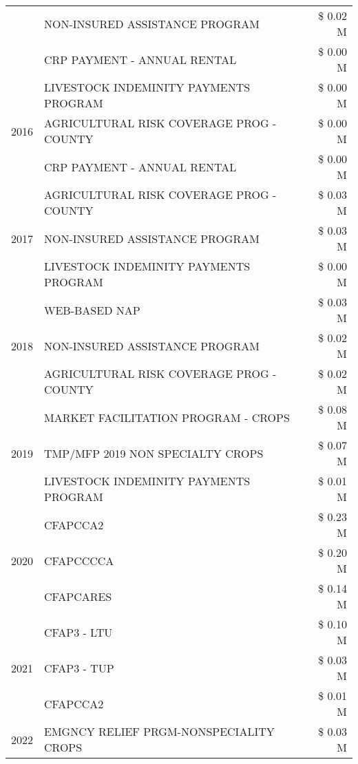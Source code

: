 \begin{tabular}{llr}
 & NON-INSURED ASSISTANCE PROGRAM & \$ 0.02 M \\
 & CRP PAYMENT - ANNUAL RENTAL & \$ 0.00 M \\
\cline{1-3}
\multirow[t]{3}{*}{2016} & LIVESTOCK INDEMINITY PAYMENTS PROGRAM & \$ 0.00 M \\
 & AGRICULTURAL RISK COVERAGE PROG - COUNTY & \$ 0.00 M \\
 & CRP PAYMENT - ANNUAL RENTAL & \$ 0.00 M \\
\cline{1-3}
\multirow[t]{3}{*}{2017} & AGRICULTURAL RISK COVERAGE PROG - COUNTY & \$ 0.03 M \\
 & NON-INSURED ASSISTANCE PROGRAM & \$ 0.03 M \\
 & LIVESTOCK INDEMINITY PAYMENTS PROGRAM & \$ 0.00 M \\
\cline{1-3}
\multirow[t]{3}{*}{2018} & WEB-BASED NAP & \$ 0.03 M \\
 & NON-INSURED ASSISTANCE PROGRAM & \$ 0.02 M \\
 & AGRICULTURAL RISK COVERAGE PROG - COUNTY & \$ 0.02 M \\
\cline{1-3}
\multirow[t]{3}{*}{2019} & MARKET FACILITATION PROGRAM - CROPS & \$ 0.08 M \\
 & TMP/MFP 2019 NON SPECIALTY CROPS & \$ 0.07 M \\
 & LIVESTOCK INDEMINITY PAYMENTS PROGRAM & \$ 0.01 M \\
\cline{1-3}
\multirow[t]{3}{*}{2020} & CFAPCCA2 & \$ 0.23 M \\
 & CFAPCCCCA & \$ 0.20 M \\
 & CFAPCARES & \$ 0.14 M \\
\cline{1-3}
\multirow[t]{3}{*}{2021} & CFAP3 - LTU & \$ 0.10 M \\
 & CFAP3 - TUP & \$ 0.03 M \\
 & CFAPCCA2 & \$ 0.01 M \\
\cline{1-3}
2022 & EMGNCY RELIEF PRGM-NONSPECIALITY CROPS & \$ 0.03 M \\
\cline{1-3}
\bottomrule
\end{tabular}
